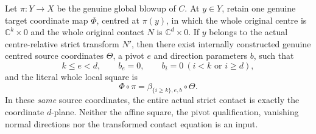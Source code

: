 \begin{theorem}
\label{hir:actual-strict-contact-zero-normal-blowup-coordinates}
\leanok
Let $\pi:Y\to X$ be the genuine global blowup of $C$. At $y\in Y$, retain one genuine target coordinate map $\Phi$, centred at $\pi(y)$, in which the whole original centre is $\mathbb C^k\times0$ and the whole original contact $N$ is $\mathbb C^d\times0$. If $y$ belongs to the actual centre-relative strict transform $N'$, then there exist internally constructed genuine centred source coordinates $\Theta$, a pivot $e$ and direction parameters $b$, such that
\[
 k\le e<d,\qquad b_e=0,\qquad b_i=0\ (i<k\text{ or }i\ge d),
\]
and the literal whole local square is
\[
 \Phi\circ\pi=\beta_{\{i\ge k\},e,b}\circ\Theta.
\]
In these \emph{same} source coordinates, the entire actual strict contact is exactly the coordinate $d$-plane. Neither the affine square, the pivot qualification, vanishing normal directions nor the transformed contact equation is an input.
\end{theorem}
